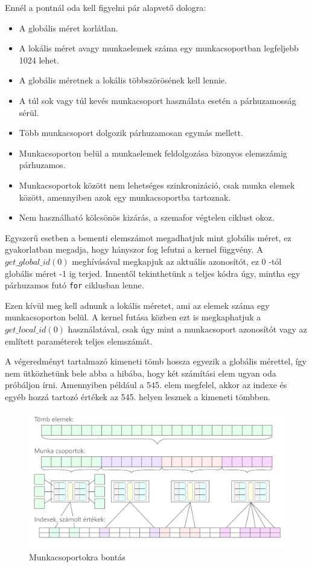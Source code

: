 Ennél a pontnál oda kell figyelni pár alapvető dologra:
\begin{itemize}
\item A globális méret korlátlan.
\item A lokális méret avagy munkaelemek száma egy munkacsoportban legfeljebb 1024 lehet.
\item A globális méretnek a lokális többszörösének kell lennie.
\item A túl sok vagy túl kevés munkacsoport használata esetén a párhuzamosság sérül.
\item Több munkacsoport dolgozik párhuzamosan egymás mellett.
\item Munkacsoporton belül a munkaelemek feldolgozása bizonyos elemszámig párhuzamos.
\item Munkacsoportok között nem lehetséges szinkronizáció, csak munka elemek között, amennyiben azok egy munkacsoportba tartoznak.
\item Nem használható kölcsönös kizárás, a szemafor végtelen ciklust okoz.
\end{itemize}


Egyszerű esetben a bementi elemszámot megadhatjuk mint globális méret, ez gyakorlatban megadja, hogy hányszor fog lefutni a kernel függvény. A $get\_global\_id(0)$ meghívásával megkapjuk az aktuális azonosítót, ez 0 -tól globális méret -1 ig terjed. Innentől tekinthetünk a teljes kódra úgy, mintha egy párhuzamos futó \texttt{for} ciklusban lenne.

Ezen kívül meg kell adnunk a lokális méretet, ami az elemek száma egy munkacsoporton belül. A kernel futása közben ezt is megkaphatjuk a $get\_local\_id(0)$ használatával, csak úgy mint a munkacsoport azonosítót vagy az említett paraméterek teljes elemszámát.

A végeredményt tartalmazó kimeneti tömb hossza egyezik a globális mérettel, így nem ütközhetünk bele abba a hibába, hogy két számítási elem ugyan oda próbáljon írni. Amennyiben például a 545. elem megfelel, akkor az indexe és egyéb hozzá tartozó értékek az 545. helyen lesznek a kimeneti tömbben.

\begin{figure}[h!]
\centering
\includegraphics[width=\textwidth]{images/workgroups.png}
\caption{Munkacsoportokra bontás}
\label{fig:opencl}
\end{figure}

